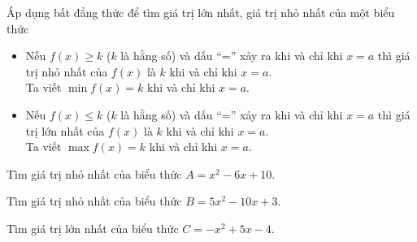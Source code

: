 \begin{dang}{Áp dụng bất đẳng thức để tìm giá trị lớn nhất, giá trị nhỏ nhất của một biểu thức}
	\begin{itemize}
		\item Nếu $f(x)\geq k$ ($k$ là hằng số) và dấu ``='' xảy ra khi và chỉ khi $x=a$ thì giá trị nhỏ nhất của $f(x)$ là $k$ khi và chỉ khi $x=a$.\\
		Ta viết $\min f(x)=k$ khi và chỉ khi $x=a$.
		\item Nếu $f(x)\leq k$ ($k$ là  hằng số)  và dấu ``='' xảy ra khi và chỉ khi $x=a$ thì giá trị lớn nhất  của $f(x)$ là $k$ khi và chỉ khi $x=a$.\\
		Ta viết $\max f(x)=k$ khi và chỉ khi $x=a$.
	\end{itemize}
\end{dang}

\begin{vd}%
	Tìm giá trị nhỏ nhất của biểu thức $A=x^2-6x+10$.
\end{vd}
\begin{vd}%
	Tìm giá trị nhỏ nhất của biểu thức $B=5x^2-10x+3$.
\end{vd}
\begin{vd}%
	Tìm giá trị lớn nhất của biểu thức $C=-x^2+5x-4$.
\end{vd}

